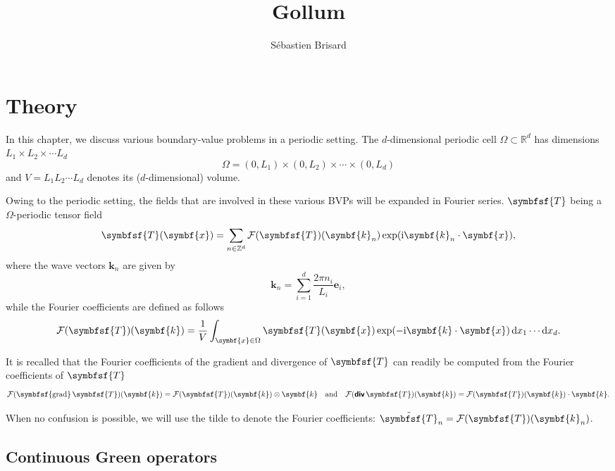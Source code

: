 \documentclass[draft, appendixprefix=true, chapterprefix=true, fontsize=12pt, numbers=noendperiod]{scrbook}
\title{Gollum}
\author{Sébastien Brisard}
\newcommand{\D}{{\mathrm d}}
\newcommand{\I}{\mathrm{i}}
\newcommand{\integers}{\mathbb{Z}}
\newcommand{\reals}{\mathbb{R}}
\DeclareMathOperator{\tdiv}{\textbf{\textsf{div}}}
\DeclareMathOperator{\tgrad}{\symbfsf{grad}}
\newcommand{\tens}[1]{\symbfsf{#1}}
\renewcommand{\vec}[1]{\symbf{#1}}
\begin{document}
\maketitle

\chapter{Theory}

In this chapter, we discuss various boundary-value problems in a periodic
setting. The \(d\)-dimensional periodic cell \(\Omega\subset\reals^d\) has
dimensions \(L_1\times L_2\times\cdots L_d\)
\begin{equation}
  \label{eq:1}
  \Omega=(0, L_1)\times(0, L_2)\times\cdots\times(0, L_d)
\end{equation}
and \(V=L_1L_2\cdots L_d\) denotes its (\(d\)-dimensional) volume.

Owing to the periodic setting, the fields that are involved in these various
BVPs will be expanded in Fourier series. \(\tens T\) being a
\(\Omega\)-periodic tensor field
\begin{equation}
  \label{eq:2}
  \tens T(\vec x)=\sum_{n\in\integers^d}\mathcal F(\tens T)(\vec k_n)\exp(\I
  \vec k_n\cdot\vec x),
\end{equation}
where the wave vectors \(\vec k_n\) are given by
\begin{equation}
  \label{eq:3}
  \vec k_n=\sum_{i=1}^d\frac{2\pi n_i}{L_i}\vec e_i,
\end{equation}
while the Fourier coefficients are defined as follows
\begin{equation}
  \label{eq:5}
  \mathcal F(\tens T)(\vec k)=\frac1V\int_{\vec x\in\Omega}\tens T(\vec x)
  \exp(-\I\vec k\cdot\vec x)\,\D x_1\cdots\D x_d.
\end{equation}

It is recalled that the Fourier coefficients of the gradient and divergence of
\(\tens T\) can readily be computed from the Fourier coefficients of
\(\tens T\)
\begin{equation}
  \label{eq:4}
  \mathcal F(\tgrad\tens T)(\vec k)=\mathcal F(\tens T)(\vec k)\otimes\vec k
  \quad\text{and}\quad
  \mathcal F(\tdiv\tens T)(\vec k)=\mathcal F(\tens T)(\vec k)\cdot\vec k.
\end{equation}

When no confusion is possible, we will use the tilde to denote the Fourier
coefficients: \(\tilde{\tens T}_n=\mathcal F(\tens T)(\vec k_n)\).

\section{Continuous Green operators}
\end{document}
